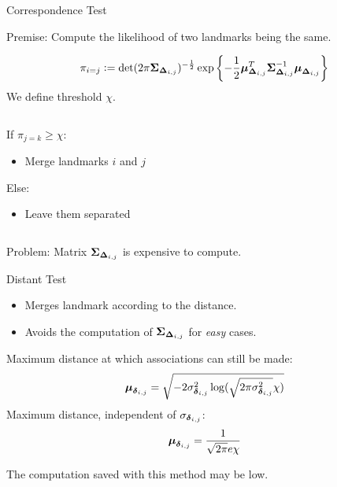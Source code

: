 \documentclass{beamer}
\begin{document}
\begin{frame}[fragile]{Correspondence Test}
\begin{block}{}
Premise: Compute the likelihood of two landmarks being the same.
\end{block}

\begin{equation*}
\pi_{i=j} \vcentcolon=
\det(2\pi\boldsymbol{\Sigma}_{\boldsymbol{\Delta}_{i,j}})^{-\frac{1}{2}}
\exp\left\lbrace-\frac{1}{2}\boldsymbol{\mu}_{\boldsymbol{\Delta}_{i,j}}^T\boldsymbol{\Sigma}_{\boldsymbol{\Delta}_{i,j}}^{-1}\boldsymbol{\mu}_{\boldsymbol{\Delta}_{i,j}}\right\rbrace
\end{equation*}
\pause
We define threshold $\chi$.
\begin{columns}
\begin{block}{}
If $\pi_{j=k} \geq \chi$:\\
\begin{itemize}
\item Merge landmarks $i$ and $j$
\end{itemize}
Else:\\
\begin{itemize}
\item Leave them separated
\end{itemize}
\end{block}
\end{columns}
\vspace{1em}
\pause
\begin{alertblock}{}
Problem: Matrix $\boldsymbol{\Sigma}_{\boldsymbol{\Delta}_{i,j}}$ is expensive to compute.
\end{alertblock}
\end{frame}

\begin{frame}{Distant Test}
\begin{block}{}
\begin{itemize}
\item Merges landmark according to the distance.
\item Avoids the computation of $\boldsymbol{\Sigma}_{\boldsymbol{\Delta}_{i,j}}$ for \textit{easy} cases.
\end{itemize}
\end{block}
\pause
Maximum distance at which associations can still be made:
\begin{equation*}
\boldsymbol{\mu}_{\boldsymbol{\delta}_{i,j}} = \sqrt{-2\sigma_{\boldsymbol{\delta}_{i,j}}^2\log(\sqrt{2\pi\sigma_{\boldsymbol{\delta}_{i,j}}^2} \chi)} \label{eq:max-distance-exp}
\end{equation*}
\pause
Maximum distance, independent of $\sigma_{\boldsymbol{\delta}_{i,j}}$:
\begin{equation*}
\boldsymbol{\mu}_{\boldsymbol{\delta}_{i,j}} = \frac{1}{\sqrt{2\pi}e\chi}
\end{equation*}
\pause
\begin{block}{}
The computation saved with this method may be low.
\end{block}
\end{frame}
\end{document}
